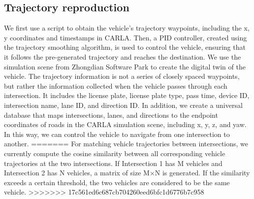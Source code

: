 \subsection{Trajectory reproduction}

We first use a script to obtain the vehicle's trajectory waypoints, including the x, y coordinates and timestamps in CARLA.
Then, a PID controller, created using the trajectory smoothing algorithm, is used to control the vehicle, ensuring that it follows the pre-generated trajectory and reaches the destination.
We use the simulation scene from Zhongdian Software Park to create the digital twin of the vehicle.
The trajectory information is not a series of closely spaced waypoints, but rather the information collected when the vehicle passes through each intersection. It includes the license plate, license plate type, pass time, device ID, intersection name, lane ID, and direction ID.
In addition, we create a universal database that maps intersections, lanes, and directions to the endpoint coordinates of roads in the CARLA simulation scene, including x, y, z, and yaw.
In this way, we can control the vehicle to navigate from one intersection to another.
=======
For matching vehicle trajectories between intersections, we currently compute the cosine similarity between all corresponding vehicle trajectories at the two intersections. If Intersection 1 has M vehicles and Intersection 2 has N vehicles, a matrix of size M×N is generated. If the similarity exceeds a certain threshold, the two vehicles are considered to be the same vehicle.
>>>>>>> 17c561ed6c687cb704260eed6bfc1d6776b7c958
